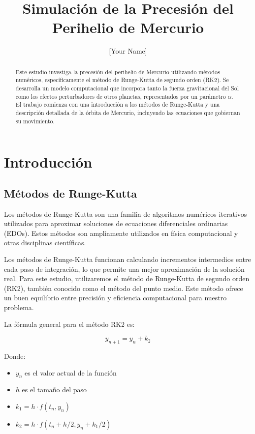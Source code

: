 \documentclass[twocolumn]{article}
\title{Simulación de la Precesión del Perihelio de Mercurio}
\author{[Your Name]}
\date{}
\begin{document}
\maketitle

\begin{abstract}
Este estudio investiga la precesión del perihelio de Mercurio utilizando métodos numéricos, específicamente el método de Runge-Kutta de segundo orden (RK2). Se desarrolla un modelo computacional que incorpora tanto la fuerza gravitacional del Sol como los efectos perturbadores de otros planetas, representados por un parámetro $\alpha$. El trabajo comienza con una introducción a los métodos de Runge-Kutta y una descripción detallada de la órbita de Mercurio, incluyendo las ecuaciones que gobiernan su movimiento.
\end{abstract}
\section{Introducción}

\subsection{Métodos de Runge-Kutta}

Los métodos de Runge-Kutta son una familia de algoritmos numéricos iterativos utilizados para aproximar soluciones de ecuaciones diferenciales ordinarias (EDOs). Estos métodos son ampliamente utilizados en física computacional y otras disciplinas científicas.

Los métodos de Runge-Kutta funcionan calculando incrementos intermedios entre cada paso de integración, lo que permite una mejor aproximación de la solución real. Para este estudio, utilizaremos el método de Runge-Kutta de segundo orden (RK2), también conocido como el método del punto medio. Este método ofrece un buen equilibrio entre precisión y eficiencia computacional para nuestro problema.

La fórmula general para el método RK2 es:

\begin{equation}
y_{n+1} = y_n + k_2
\end{equation}

Donde:
\begin{itemize}
\item $y_n$ es el valor actual de la función
\item $h$ es el tamaño del paso
\item $k_1 = h \cdot f(t_n, y_n)$
\item $k_2 = h \cdot f(t_n + h/2, y_n + k_1/2)$
\end{itemize}
\end{document}
